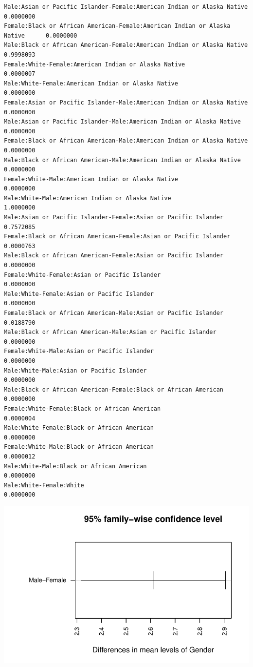\documentclass[
  letterpaper,
  DIV=11,
  numbers=noendperiod]{scrartcl}
\begin{document}
\begin{verbatim}
Male:Asian or Pacific Islander-Female:American Indian or Alaska Native        0.0000000
Female:Black or African American-Female:American Indian or Alaska Native      0.0000000
Male:Black or African American-Female:American Indian or Alaska Native        0.9998093
Female:White-Female:American Indian or Alaska Native                          0.0000007
Male:White-Female:American Indian or Alaska Native                            0.0000000
Female:Asian or Pacific Islander-Male:American Indian or Alaska Native        0.0000000
Male:Asian or Pacific Islander-Male:American Indian or Alaska Native          0.0000000
Female:Black or African American-Male:American Indian or Alaska Native        0.0000000
Male:Black or African American-Male:American Indian or Alaska Native          0.0000000
Female:White-Male:American Indian or Alaska Native                            0.0000000
Male:White-Male:American Indian or Alaska Native                              1.0000000
Male:Asian or Pacific Islander-Female:Asian or Pacific Islander               0.7572085
Female:Black or African American-Female:Asian or Pacific Islander             0.0000763
Male:Black or African American-Female:Asian or Pacific Islander               0.0000000
Female:White-Female:Asian or Pacific Islander                                 0.0000000
Male:White-Female:Asian or Pacific Islander                                   0.0000000
Female:Black or African American-Male:Asian or Pacific Islander               0.0188790
Male:Black or African American-Male:Asian or Pacific Islander                 0.0000000
Female:White-Male:Asian or Pacific Islander                                   0.0000000
Male:White-Male:Asian or Pacific Islander                                     0.0000000
Male:Black or African American-Female:Black or African American               0.0000000
Female:White-Female:Black or African American                                 0.0000004
Male:White-Female:Black or African American                                   0.0000000
Female:White-Male:Black or African American                                   0.0000012
Male:White-Male:Black or African American                                     0.0000000
Male:White-Female:White                                                       0.0000000
\end{verbatim}

\includegraphics{Sec4_Team10_files/figure-pdf/unnamed-chunk-10-1.pdf}
\end{document}
